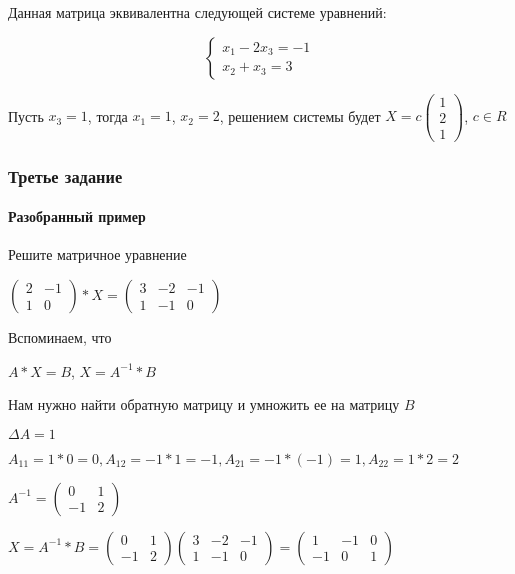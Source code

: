 \documentclass{article}
\begin{document}
\begin{flushleft}
Данная матрица эквивалентна следующей системе уравнений:

\begin{equation}
    \begin{cases}
        x_1 - 2x_3 = -1 \\
        x_2 + x_3 = 3
    \end{cases}
\end{equation}

Пусть $x_3 = 1$, тогда $x_1 = 1$, $x_2 = 2$, решением системы будет $X = c \begin{pmatrix}
    1 \\
    2 \\
    1
\end{pmatrix}$, $c \in R$

\pagebreak
\subsubsection{Третье задание}

\paragraph{Разобранный пример}

Решите матричное уравнение

$\begin{pmatrix}
    2 & -1 \\
    1 & 0
\end{pmatrix} * X = \begin{pmatrix}
    3 & -2 & -1 \\
    1 & -1 & 0
\end{pmatrix}$

\bigskip

Вспоминаем, что

$A * X = B$, $X = A^{-1} * B$

Нам нужно найти обратную матрицу и умножить ее на матрицу $B$

\bigskip

$\Delta A = 1$

$A_{11} = 1 * 0 = 0 , A_{12} = -1 * 1 = -1, A_{21} = -1 * (-1) = 1, A_{22} = 1 * 2 = 2$

$A^{-1} = \begin{pmatrix}
    0 & 1 \\
    -1 & 2
\end{pmatrix}$

\bigskip

$X = A^{-1} * B = \begin{pmatrix}
    0 & 1 \\
    -1 & 2
\end{pmatrix} \begin{pmatrix}
    3 & -2 & -1 \\
    1 & -1 & 0
\end{pmatrix} = \begin{pmatrix}
    1 & -1 & 0 \\
    -1 & 0 & 1
\end{pmatrix}$


\end{flushleft}
\end{document}
